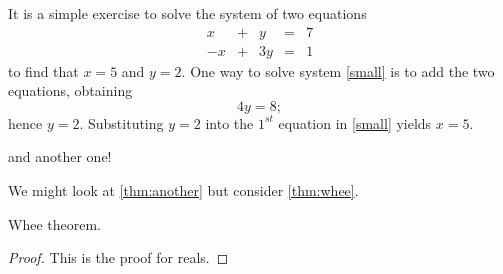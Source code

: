 \documentclass{ximera}
\begin{document}
It is a simple exercise to solve the system of two equations
\begin{equation} \label{small}
\begin{array}{rcrcr}
 x & + & y & = & 7 \\
-x & + & 3y & = & 1
\end{array}
\end{equation}
to find that $x=5$ and $y=2$.  One way to solve
system \eqref{small} is to add the two equations, obtaining
\[
4y=8;
\]
hence $y=2$.  Substituting $y=2$ into the $1^{st}$ equation in
\ref{small} yields $x=5$.





and another one!



We might look at \ref{thm:another} but consider \ref{thm:whee}.

\begin{theorem}
  \label{thm:whee}  Whee theorem.
\end{theorem}
\begin{proof}
This is the proof for reals.
\end{proof}
\end{document}
